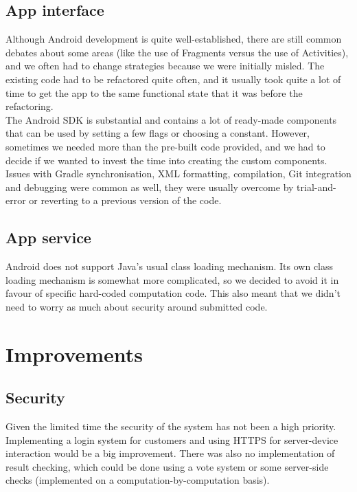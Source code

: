 \documentclass[a4paper,10pt]{article}
\begin{document}
\subsection{App interface}
Although Android development is quite well-established, there are still common debates about some areas (like the use of Fragments versus the use of Activities), and we often had to change strategies because we were initially misled. The existing code had to be refactored quite often, and it usually took quite a lot of time to get the app to the same functional state that it was before the refactoring. \\

The Android SDK is substantial and contains a lot of ready-made components that can be used by setting a few flags or choosing a constant. However, sometimes we needed more than the pre-built code provided, and we had to decide if we wanted to invest the time into creating the custom components.\\

Issues with Gradle synchronisation, XML formatting, compilation, Git integration and debugging were common as well, they were usually overcome by trial-and-error or reverting to a previous version of the code.

\subsection{App service}

Android does not support Java's usual class loading mechanism. Its own class loading mechanism is somewhat more complicated, so we decided to avoid it in favour of specific hard-coded computation code. This also meant that we didn't need to worry as much about security around submitted code.

\section{Improvements}

\subsection{Security}

Given the limited time the security of the system has not been a high priority.
Implementing a login system for customers and using HTTPS for server-device interaction would be a big improvement.
There was also no implementation of result checking, which could be done using a vote system or some server-side checks (implemented on a computation-by-computation basis).
\end{document}
